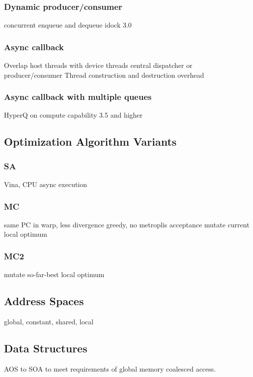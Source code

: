 \documentclass[10pt, conference, compsocconf]{../IEEEtran}
\begin{document}
\subsubsection{Dynamic producer/consumer}
concurrent enqueue and dequeue
idock 3.0

\subsubsection{Async callback}
Overlap host threads with device threads
central dispatcher or producer/consumer
Thread construction and destruction overhead

\subsubsection{Async callback with multiple queues}
HyperQ on compute capability 3.5 and higher

\subsection{Optimization Algorithm Variants}

\subsubsection{SA}
Vina, CPU async execution

\subsubsection{MC}
same PC in warp, less divergence
greedy, no metroplis acceptance
mutate current local optimum

\subsubsection{MC2}
mutate so-far-best local optimum

\subsection{Address Spaces}

global, constant, shared, local

\subsection{Data Structures}

AOS to SOA to meet requirements of global memory coalesced access.
\end{document}
